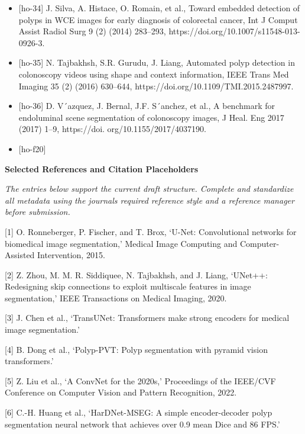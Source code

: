 \begin{itemize}
  WM-DOVA maps for accurate polyp highlighting in colonoscopy:
  validation vs. saliency maps from physicians, Comput. Med. Imaging
  Graph. 43 (2015) 99--111, https://doi.org/
  10.1016/j.compmedimag.2015.02.007.
\item
  {[}ho-34{]} J. Silva, A. Histace, O. Romain, et al., Toward embedded
  detection of polyps in WCE images for early diagnosis of colorectal
  cancer, Int J Comput Assist Radiol Surg 9 (2) (2014) 283--293,
  https://doi.org/10.1007/s11548-013-0926-3.
\item
  {[}ho-35{]} N. Tajbakhsh, S.R. Gurudu, J. Liang, Automated polyp
  detection in colonoscopy videos using shape and context information,
  IEEE Trans Med Imaging 35 (2) (2016) 630--644,
  https://doi.org/10.1109/TMI.2015.2487997.
\item
  {[}ho-36{]} D. V´azquez, J. Bernal, J.F. S´anchez, et al., A benchmark
  for endoluminal scene segmentation of colonoscopy images, J Heal. Eng
  2017 (2017) 1--9, https://doi. org/10.1155/2017/4037190.
\item
  {[}ho-f20{]}
\end{itemize}

\textbf{Selected References and Citation Placeholders}

\emph{The entries below support the current draft structure. Complete
and standardize all metadata using the journal\textquotesingle s
required reference style and a reference manager before submission.}

{[}1{]} O. Ronneberger, P. Fischer, and T. Brox, `U-Net: Convolutional
networks for biomedical image segmentation,' Medical Image Computing and
Computer-Assisted Intervention, 2015.

{[}2{]} Z. Zhou, M. M. R. Siddiquee, N. Tajbakhsh, and J. Liang,
`UNet++: Redesigning skip connections to exploit multiscale features in
image segmentation,' IEEE Transactions on Medical Imaging, 2020.

{[}3{]} J. Chen et al., `TransUNet: Transformers make strong encoders
for medical image segmentation.'

{[}4{]} B. Dong et al., `Polyp-PVT: Polyp segmentation with pyramid
vision transformers.'

{[}5{]} Z. Liu et al., `A ConvNet for the 2020s,' Proceedings of the
IEEE/CVF Conference on Computer Vision and Pattern Recognition, 2022.

{[}6{]} C.-H. Huang et al., `HarDNet-MSEG: A simple encoder-decoder
polyp segmentation neural network that achieves over 0.9 mean Dice and
86 FPS.'

